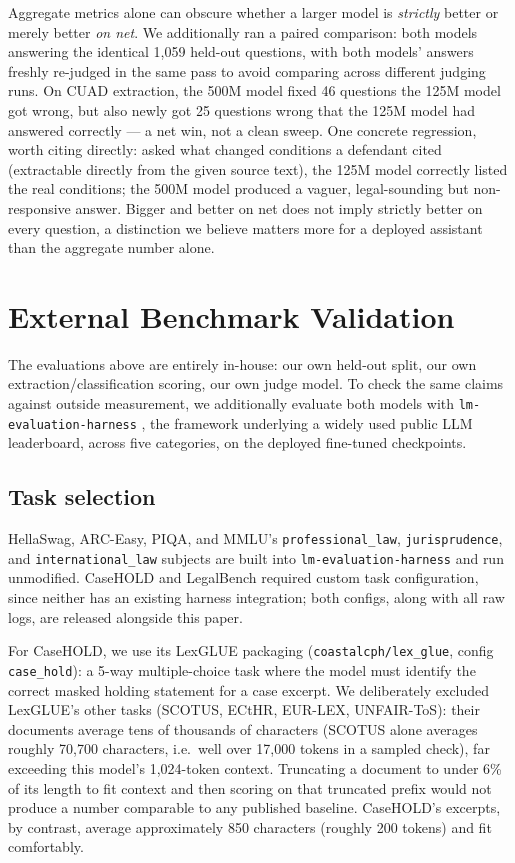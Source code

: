 \documentclass[11pt]{article}
\begin{document}
Aggregate metrics alone can obscure whether a larger model is
\emph{strictly} better or merely better \emph{on net}. We additionally ran
a paired comparison: both models answering the identical 1{,}059 held-out
questions, with both models' answers freshly re-judged in the same pass
to avoid comparing across different judging runs. On CUAD extraction, the
500M model fixed 46 questions the 125M model got wrong, but also newly
got 25 questions wrong that the 125M model had answered correctly --- a
net win, not a clean sweep. One concrete regression, worth citing
directly: asked what changed conditions a defendant cited (extractable
directly from the given source text), the 125M model correctly listed
the real conditions; the 500M model produced a vaguer, legal-sounding but
non-responsive answer. Bigger and better on net does not imply strictly
better on every question, a distinction we believe matters more for a
deployed assistant than the aggregate number alone.

\section{External Benchmark Validation}
\label{sec:external}

The evaluations above are entirely in-house: our own held-out split, our
own extraction/classification scoring, our own judge model. To check the
same claims against outside measurement, we additionally evaluate both
models with \texttt{lm-evaluation-harness} \citep{eval-harness}, the
framework underlying a widely used public LLM leaderboard, across five
categories, on the deployed fine-tuned checkpoints.

\subsection{Task selection}

HellaSwag, ARC-Easy, PIQA, and MMLU's \texttt{professional\_\allowbreak law},
\texttt{jurisprudence}, and \texttt{international\_\allowbreak law} subjects are
built into \texttt{lm-evaluation-harness} and run unmodified. CaseHOLD
and LegalBench required custom task configuration, since neither has an
existing harness integration; both configs, along with all raw logs, are
released alongside this paper.

For CaseHOLD, we use its LexGLUE packaging
(\texttt{coastalcph/lex\_glue}, config \texttt{case\_hold}): a 5-way
multiple-choice task where the model must identify the correct masked
holding statement for a case excerpt. We deliberately excluded LexGLUE's
other tasks (SCOTUS, ECtHR, EUR-LEX, UNFAIR-ToS): their documents average
tens of thousands of characters (SCOTUS alone averages roughly 70{,}700
characters, i.e.\ well over 17{,}000 tokens in a sampled check), far
exceeding this model's 1{,}024-token context. Truncating a document to
under 6\% of its length to fit context and then scoring on that truncated
prefix would not produce a number comparable to any published baseline.
CaseHOLD's excerpts, by contrast, average approximately 850 characters
(roughly 200 tokens) and fit comfortably.
\end{document}
